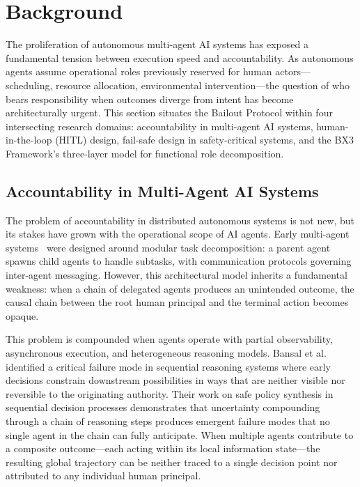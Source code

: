 \documentclass[12pt]{article}
\begin{document}
\section{Background}

The proliferation of autonomous multi-agent AI systems has exposed a fundamental tension between execution speed and accountability. As autonomous agents assume operational roles previously reserved for human actors—scheduling, resource allocation, environmental intervention—the question of who bears responsibility when outcomes diverge from intent has become architecturally urgent. This section situates the Bailout Protocol within four intersecting research domains: accountability in multi-agent AI systems, human-in-the-loop (HITL) design, fail-safe design in safety-critical systems, and the BX3 Framework's three-layer model for functional role decomposition.

\subsection{Accountability in Multi-Agent AI Systems}

The problem of accountability in distributed autonomous systems is not new, but its stakes have grown with the operational scope of AI agents. Early multi-agent systems~\cite{trist1981} were designed around modular task decomposition: a parent agent spawns child agents to handle subtasks, with communication protocols governing inter-agent messaging. However, this architectural model inherits a fundamental weakness: when a chain of delegated agents produces an unintended outcome, the causal chain between the root human principal and the terminal action becomes opaque.

This problem is compounded when agents operate with partial observability, asynchronous execution, and heterogeneous reasoning models. Bansal et al.\ \cite{bansal2019} identified a critical failure mode in sequential reasoning systems where early decisions constrain downstream possibilities in ways that are neither visible nor reversible to the originating authority. Their work on safe policy synthesis in sequential decision processes demonstrates that uncertainty compounding through a chain of reasoning steps produces emergent failure modes that no single agent in the chain can fully anticipate. When multiple agents contribute to a composite outcome—each acting within its local information state—the resulting global trajectory can be neither traced to a single decision point nor attributed to any individual human principal.
\end{document}
